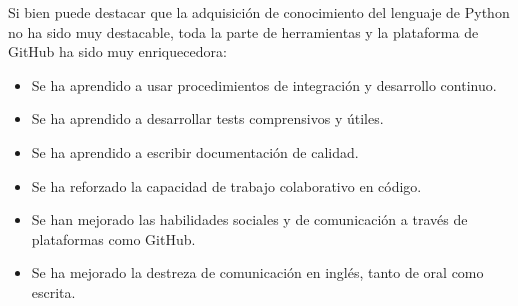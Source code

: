 Si bien puede destacar que la adquisición de conocimiento del lenguaje de Python no ha sido muy destacable, toda la parte de herramientas y la plataforma de GitHub ha sido muy enriquecedora:

\begin{itemize}
  \item Se ha aprendido a usar procedimientos de integración y desarrollo continuo.
  \item Se ha aprendido a desarrollar tests comprensivos y útiles.
  \item Se ha aprendido a escribir documentación de calidad.
  \item Se ha reforzado la capacidad de trabajo colaborativo en código.
  \item Se han mejorado las habilidades sociales y de comunicación a través de plataformas como GitHub.
  \item Se ha mejorado la destreza de comunicación en inglés, tanto de oral como escrita.
\end{itemize}

